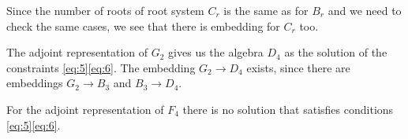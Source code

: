 \documentclass{article}
\newcommand{\gf}{\mathfrak{g}}
\newcommand{\af}{\mathfrak{a}}
\begin{document}
Since the number of roots of root system $C_{r}$ is the same as for $B_{r}$ and we need to check the
same cases, we see that there is embedding for $C_{r}$ too. 

The adjoint representation of $G_{2}$ gives us the algebra $D_{4}$ as the solution of the
constraints \eqref{eq:5}\eqref{eq:6}. The embedding $G_{2}\to D_{4}$ exists, since there are
embeddings $G_{2}\to B_{3}$ and $B_{3}\to D_{4}$. 

For the adjoint representation of $F_{4}$ there is no solution that satisfies conditions
\eqref{eq:5}\eqref{eq:6}. 

\end{document}
